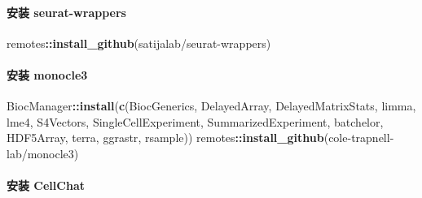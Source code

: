\documentclass[
]{article}
\newenvironment{Shaded}{\begin{snugshade}}{\end{snugshade}}
\newcommand{\KeywordTok}[1]{\textcolor[rgb]{0.13,0.29,0.53}{\textbf{#1}}}
\newcommand{\NormalTok}[1]{#1}
\newcommand{\OperatorTok}[1]{\textcolor[rgb]{0.81,0.36,0.00}{\textbf{#1}}}
\newcommand{\StringTok}[1]{\textcolor[rgb]{0.31,0.60,0.02}{#1}}
\begin{document}
\hypertarget{ux5b89ux88c5-seurat-wrappers}{%
\paragraph{安装 seurat-wrappers}\label{ux5b89ux88c5-seurat-wrappers}}

\begin{Shaded}
\begin{Highlighting}[]
\NormalTok{remotes}\OperatorTok{::}\KeywordTok{install\_github}\NormalTok{(}\StringTok{\textquotesingle{}satijalab/seurat{-}wrappers\textquotesingle{}}\NormalTok{)}
\end{Highlighting}
\end{Shaded}

\hypertarget{ux5b89ux88c5-monocle3}{%
\paragraph{安装 monocle3}\label{ux5b89ux88c5-monocle3}}

\begin{Shaded}
\begin{Highlighting}[]
\NormalTok{BiocManager}\OperatorTok{::}\KeywordTok{install}\NormalTok{(}\KeywordTok{c}\NormalTok{(}\StringTok{\textquotesingle{}BiocGenerics\textquotesingle{}}\NormalTok{, }\StringTok{\textquotesingle{}DelayedArray\textquotesingle{}}\NormalTok{, }\StringTok{\textquotesingle{}DelayedMatrixStats\textquotesingle{}}\NormalTok{,}
    \StringTok{\textquotesingle{}limma\textquotesingle{}}\NormalTok{, }\StringTok{\textquotesingle{}lme4\textquotesingle{}}\NormalTok{, }\StringTok{\textquotesingle{}S4Vectors\textquotesingle{}}\NormalTok{, }\StringTok{\textquotesingle{}SingleCellExperiment\textquotesingle{}}\NormalTok{,}
    \StringTok{\textquotesingle{}SummarizedExperiment\textquotesingle{}}\NormalTok{, }\StringTok{\textquotesingle{}batchelor\textquotesingle{}}\NormalTok{, }\StringTok{\textquotesingle{}HDF5Array\textquotesingle{}}\NormalTok{,}
    \StringTok{\textquotesingle{}terra\textquotesingle{}}\NormalTok{, }\StringTok{\textquotesingle{}ggrastr\textquotesingle{}}\NormalTok{, }\StringTok{\textquotesingle{}rsample\textquotesingle{}}\NormalTok{))}
\NormalTok{remotes}\OperatorTok{::}\KeywordTok{install\_github}\NormalTok{(}\StringTok{\textquotesingle{}cole{-}trapnell{-}lab/monocle3\textquotesingle{}}\NormalTok{)}
\end{Highlighting}
\end{Shaded}

\hypertarget{ux5b89ux88c5-cellchat}{%
\paragraph{安装 CellChat}\label{ux5b89ux88c5-cellchat}}
\end{document}
